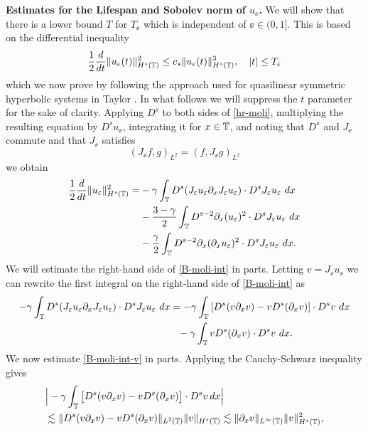 \textbf{Estimates for the Lifespan and Sobolev norm of $u_\ee$.}
%
We will show that there is a lower bound  $T$
for $T_\ee$ which is independent of $\ee\in(0, 1]$.
This is based on the differential
inequality 
%
%
%
\begin{equation} \label{B-diff-ineq}
\frac 12
\frac{d}{dt}
\|u_\varepsilon(t)\|_{H^{s}(\mathbb{T})}^2
\le
c_s
\|u_\varepsilon(t)\|_{H^{s}(\mathbb{T})}^3,
\quad
|t| \le T_\varepsilon
\end{equation}
%
%
%
%
which we now prove by
following the approach used for quasilinear symmetric
hyperbolic systems in Taylor  \cite{Taylor_1991_Pseudodifferent}. In what 
follows we will suppress the
$t$ parameter for the sake of clarity.
%
%
%
Applying $D^s$ to both sides of  \eqref{hr-moli},
multiplying the resulting equation by $D^s u_\ee$,
integrating it for $x\in\mathbb{T}$, and noting that 
$D^s$ and $J_\ee$ commute
and that  $J_\ee$ satisfies 
%
%
\begin{equation} 
\label{J-e-inner-prod-property}
(J_\ee f, g)_{L^2}=( f, J_\ee g)_{L^2}
\end{equation}
%
%
we obtain
%
%
%
\begin{equation} \begin{split}
\label{B-moli-int}
 \frac 12
\frac{d}{dt} \|u_\varepsilon \|_{H^s(\mathbb{T})}^2
=
& -
\gamma \int_{\mathbb{T}}  D^s(J_\varepsilon u_\varepsilon \partial_x J_\varepsilon u_\varepsilon) \cdot
D^s J_\varepsilon u_\varepsilon  \  dx
\\
&- \frac{3 -\gamma}{2} \int_{\mathbb{T}} D^{s-2} \partial_x (u_{\varepsilon})^2 \cdot D^s J_\varepsilon 
u_{\varepsilon} \ dx
\\
& - \frac{\gamma}{2} \int_{\mathbb{T}}  D^{s-2} \partial_x (\partial_x u_\varepsilon)^2
\cdot D^s J_\varepsilon u_\varepsilon  \ dx.
\end{split}
\end{equation}
%
%
%
We will estimate the right-hand side of \eqref{B-moli-int} in parts.  
Letting $v=J_\ee u_\ee$ we can rewrite the first integral on the right-hand 
side of \eqref{B-moli-int} as 
%
%
%
\begin{equation} \begin{split}
\label{B-moli-int-v}
-  \gamma \int_{\mathbb{T}}   D^s (J_{\varepsilon} u_{\varepsilon} \partial_x J_\varepsilon u_\varepsilon)
\cdot D^s
J_{\varepsilon}u_\varepsilon \ dx & = - \gamma \int_{\mathbb{T}}
\left [ D^s(v\partial_x v)  -  v D^s (\partial_xv)
\right ] \cdot D^s v \ dx
\\
& \phantom{=} - \gamma \int_{\mathbb{T}}
v D^s (\partial_xv) 
\cdot D^s v \ dx.
\end{split}
\end{equation}
%
%
%
%
%
We now estimate \eqref{B-moli-int-v} in parts. Applying the Cauchy-Schwarz 
inequality gives
%
%
%
\begin{equation} \label{int1-est-calc2}
\begin{split}
& \Big|
- \gamma \int_{\mathbb{T}}
\big[ D^s(v\partial_x v)  -  v D^s (\partial_xv)
\big]
\cdot D^s v   \, dx
\Big|
\\
& \lesssim
\|
D^s(v\partial_x v)  -  v D^s (\partial_xv)
\|_{L^2(\mathbb{T})}
\|
v
\|_{H^s(\mathbb{T})}
\lesssim \| \partial_x v \|_{L^\infty(\mathbb{T})} \| v \|_{H^s(\mathbb{T})}^2,
\end{split}
\end{equation}

